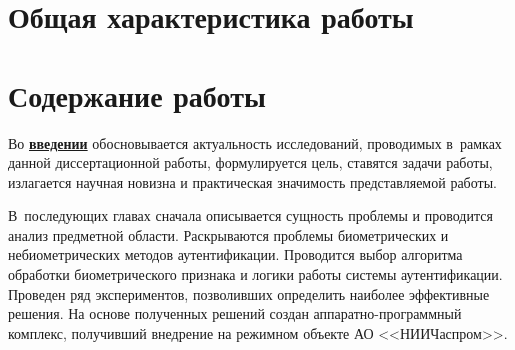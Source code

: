 
\section*{Общая характеристика работы}

\newcommand{\actuality}{\underline{\textbf{\actualityTXT}}}
\newcommand{\progress}{\underline{\textbf{\progressTXT}}}
\newcommand{\aim}{\underline{{\textbf\aimTXT}}}
\newcommand{\tasks}{\underline{\textbf{\tasksTXT}}}
\newcommand{\novelty}{\underline{\textbf{\noveltyTXT}}}
\newcommand{\influence}{\underline{\textbf{\influenceTXT}}}
\newcommand{\methods}{\underline{\textbf{\methodsTXT}}}
\newcommand{\defpositions}{\underline{\textbf{\defpositionsTXT}}}
\newcommand{\reliability}{\underline{\textbf{\reliabilityTXT}}}
\newcommand{\probation}{\underline{\textbf{\probationTXT}}}
\newcommand{\contribution}{\underline{\textbf{\contributionTXT}}}
\newcommand{\publications}{\underline{\textbf{\publicationsTXT}}}




\section*{Содержание работы}
Во \underline{\textbf{введении}} обосновывается актуальность исследований, проводимых в~рамках данной диссертационной работы, формулируется цель, ставятся задачи работы, излагается научная новизна и практическая значимость представляемой работы.

В~последующих главах сначала описывается сущность проблемы и проводится анализ предметной области. Раскрываются проблемы биометрических и небиометрических методов аутентификации. Проводится выбор алгоритма обработки биометрического признака и логики работы системы аутентификации. Проведен ряд экспериментов, позволивших определить наиболее эффективные решения. На основе полученных решений создан аппаратно-программный комплекс, получивший внедрение на режимном объекте АО <<НИИЧаспром>>.


